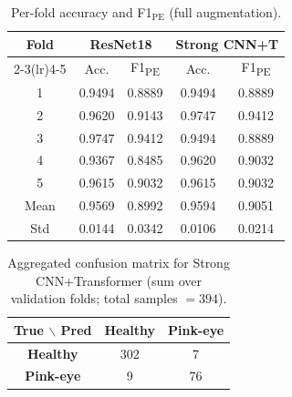 \documentclass[preprint,12pt,authoryear]{elsarticle}
\begin{document}
\begin{table}
  \caption{Per-fold accuracy and F1$_{\mathrm{PE}}$ (full augmentation).}
  \label{tab:per_fold}
  \centering
  \begin{tabular}{ccccc}
    \toprule
    \multirow{2}{*}{\textbf{Fold}}
      & \multicolumn{2}{c}{\textbf{ResNet18}}
      & \multicolumn{2}{c}{\textbf{Strong CNN+T}} \\
    \cmidrule(lr){2-3}\cmidrule(lr){4-5}
      & Acc. & F1\textsubscript{PE}
      & Acc. & F1\textsubscript{PE} \\
    \midrule
    1 & 0.9494 & 0.8889 & 0.9494 & 0.8889 \\
    2 & 0.9620 & 0.9143 & 0.9747 & 0.9412 \\
    3 & 0.9747 & 0.9412 & 0.9494 & 0.8889 \\
    4 & 0.9367 & 0.8485 & 0.9620 & 0.9032 \\
    5 & 0.9615 & 0.9032 & 0.9615 & 0.9032 \\
    \midrule
    Mean & 0.9569 & 0.8992 & 0.9594 & 0.9051 \\
    Std  & 0.0144 & 0.0342 & 0.0106 & 0.0214 \\
    \bottomrule
  \end{tabular}
\end{table}

\begin{table}
  \caption{Aggregated confusion matrix for Strong CNN+Transformer (sum over validation folds; total samples $=394$).}
  \label{tab:confusion}
  \centering
  \begin{tabular}{ccc}
    \toprule
    \textbf{True $\backslash$ Pred}
      & \textbf{Healthy}
      & \textbf{Pink-eye} \\
    \midrule
    \textbf{Healthy}  & 302 & \phantom{0}7 \\
    \textbf{Pink-eye} & \phantom{0}9 & 76 \\
    \bottomrule
  \end{tabular}
\end{table}
\end{document}
